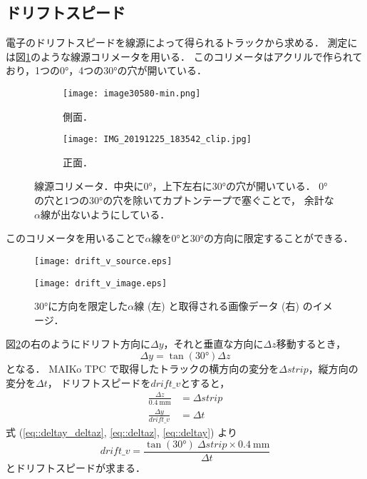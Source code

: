\documentclass[../master]{subfiles}
\begin{document}
\subsection{ドリフトスピード}
電子のドリフトスピードを線源によって得られるトラックから求める．
測定には図\ref{pic::collimator}のような線源コリメータを用いる．
このコリメータはアクリルで作られており，1つの\ang{0}，4つの\ang{30}の穴が開いている．
\begin{figure}
  \centering
  \begin{subfigure}{0.45\columnwidth}
    \centering
    \texttt{[image: image30580-min.png]}
    \caption{側面．}
  \end{subfigure}
  \begin{subfigure}{0.45\columnwidth}
    \centering
    \texttt{[image: IMG\_20191225\_183542\_clip.jpg]}
    \caption{正面．}
  \end{subfigure}
  \caption[線源コリメータ．]
          {線源コリメータ．中央に\ang{0}，上下左右に\ang{30}の穴が開いている．
            \ang{0}の穴と1つの\ang{30}の穴を除いてカプトンテープで塞ぐことで，
            余計な$\alpha$線が出ないようにしている．
          }
          \label{pic::collimator}
\end{figure}
このコリメータを用いることで$\alpha$線を\ang{0}と\ang{30}の方向に限定することができる．
\begin{figure}
  \centering
  \begin{minipage}{0.45\columnwidth}
    \centering
    \texttt{[image: drift\_v\_source.eps]}
  \end{minipage}
  \begin{minipage}{0.45\columnwidth}
    \centering
    \texttt{[image: drift\_v\_image.eps]}
  \end{minipage}
  \caption[\ang{30}に方向を限定した$\alpha$線と取得される画像データのイメージ．]
          {\ang{30}に方向を限定した$\alpha$線 (左) と取得される画像データ (右) のイメージ．}
  \label{fig::drift_v_image}
\end{figure}
図\ref{fig::drift_v_image}の右のようにドリフト方向に$\Delta y$，それと垂直な方向に$\Delta z$移動するとき，
\begin{equation}
  \Delta y = \tan(\ang{30})\Delta z \label{eq::deltay_deltaz}
\end{equation}
となる．
MAIKo TPC で取得したトラックの横方向の変分を$\Delta strip$，縦方向の変分を$\Delta t$，
ドリフトスピードを$drift\_v$とすると，
\begin{align}
  \frac{\Delta z}{\SI{0.4}{\milli\metre}} & = \Delta strip \label{eq::deltaz}\\
  \frac{\Delta y}{drift\_v} & = \Delta t \label{eq::deltay}
\end{align}
式 (\ref{eq::deltay_deltaz}, \ref{eq::deltaz}, \ref{eq::deltay}) より
\begin{equation}
  drift\_v = \frac{\tan(\ang{30})~\Delta strip\times\SI{0.4}{\milli\metre}}{\Delta t}
\end{equation}
とドリフトスピードが求まる．
\end{document}
